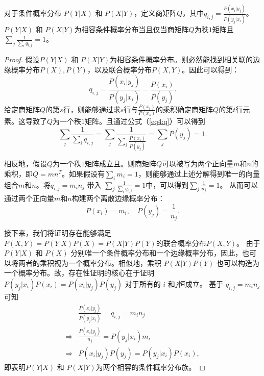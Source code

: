 \begin{theorem}
    \label{thm4}
    对于条件概率分布 $P(Y|X)$ 和 $P(X|Y)$，定义商矩阵$Q$，其中${q}_{i,j} = \frac{P(x_i|y_j)}{P(y_j|x_i)}$。$P(Y|X)$ 和 $P(X|Y)$为相容条件概率分布当且仅当商矩阵$Q$为秩$1$矩阵且$\sum_j\frac{1}{\sum_i {q}_{i,j}} = 1$。
\end{theorem}
\begin{proof}
    假设$P(Y|X)$ 和 $P(X|Y)$为相容条件概率分布。则必然能找到相关联的边缘概率分布$P(X), P(Y)$，以及联合概率分布$P(X, Y)$。因此可以得到：
    \begin{equation}
    {q}_{i,j} = \frac{P(x_i|y_j)}{P(y_j|x_i)} = \frac{P(x_i)}{P(y_j)}.
    \label{eq4:q}
    \end{equation}
    给定商矩阵$Q$的第$s$行，则能够通过求$s$行与$\frac{P(x_t)}{P(x_s)}$的乘积确定商矩阵$Q$的第$t$行元素。这导致了$Q$为一个秩$1$矩阵。且通过公式（\ref{eq4:q}）可以得到
    \begin{equation}
    \sum_j\frac{1}{\sum_i {q}_{i,j}} = \sum_j\frac{1}{\sum_i \frac{P(x_i)}{P(y_j)}} = \sum_j P(y_j) = 1.
    \end{equation}

    相反地，假设$Q$为一个秩$1$矩阵成立且。则商矩阵$Q$可以被写为两个正向量$m$和$n$的乘积，即$Q = mn^T$。如果假设有$\sum_i  {m}_i = 1$，则能够通过上述分解得到唯一的向量组合$m$和$n$。将${q}_{i,j} ={ m}_i{n}_j$ 带入 $\sum_j\frac{1}{\sum_i {q}_{i,j}} = 1$中，可以得到$\sum_j\frac{1}{{n}_j} = 1$。
    从而可以通过两个正向量$m$和$n$构建两个离散边缘概率分布：
    \begin{equation}
    P(x_i) = {m}_i, \quad P(y_j) = \frac{1}{{n}_j}.
    \end{equation}

    接下来，我们将证明存在能够满足 $P(X, Y) = P(Y|X)P(X) = P(X|Y)P(Y)$的联合概率分布$P(X, Y)$。
    由于$P(Y|X)$ 和 $P(X)$ 分别唯一个条件概率分布和一个边缘概率分布，因此，也可以将两者的乘积视为一个概率分布。相似地，乘积 $P(X|Y)P(Y)$ 也可以构造为一个概率分布。故，存在性证明的核心在于证明 $P(y_j|x_i)P(x_i) = P(x_i|y_j)P(y_j)$ 对于所有的 $i$ 和$j$恒成立。
    基于 ${q}_{i,j} = {m}_i{n}_j$可知
    \begin{equation}
    \begin{split}
    &\frac{P(x_i|y_j)}{P(y_j|x_i)} = {q}_{i,j} = {m}_i{n}_j\\
    \Rightarrow &\frac{P(x_i|y_j)}{{n}_j} = P(y_j|x_i) {m}_i\\
    \Rightarrow &P(x_i|y_j)P(y_j) = P(y_j|x_i)P(x_i), 
    \end{split}
    \end{equation}
    即表明$P(Y|X)$ 和 $P(X|Y)$为两个相容的条件概率分布族。
\end{proof}


